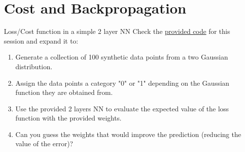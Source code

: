 \documentclass{beamer}
\begin{document}
\section{Cost and Backpropagation}

\begin{frame}
    \begin{Exercise}{Loss/Cost function in a simple 2 layer NN}
        \label{Ex:2layer}
        Check the \href{https://github.com/Biocomputing-Teaching/Data-Science-with-Python/blob/main/code/UNIT9-Neural-Networks.ipynb}{provided code} for this session and expand it to:
        \begin{enumerate}
            \item Generate a collection of 100 synthetic data points from a two Gaussian distribution.
            \item Assign the data points a category "0" or "1" depending on the Gaussian function they are obtained from.
            \item Use the provided 2 layers NN to evaluate the expected value of the loss function with the provided weights.
            \item Can you guess the weights that would improve the prediction (reducing the value of the error)?
        \end{enumerate}
    \end{Exercise}
\end{frame}
\end{document}
